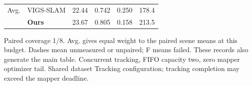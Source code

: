 \begin{table}[tbp]
{\begin{tabular}{@{}llcccc@{}}
\addlinespace[2pt]
\midrule
Avg. & VIGS-SLAM & 22.44 & 0.742 & 0.250 & 178.4 \\
 & \textbf{Ours} & 23.67 & 0.805 & 0.158 & 213.5 \\
\bottomrule
\end{tabular}}
\endgroup
\par\vspace{3pt}
\begin{minipage}{\linewidth}
\scriptsize\raggedright Paired coverage 1/8. Avg. gives equal weight to the paired scene means at this budget. Dashes mean unmeasured or unpaired; F means failed. These records also generate the main table. Concurrent tracking, FIFO capacity two, zero mapper optimizer tail. Shared dataset Tracking configuration; tracking completion may exceed the mapper deadline.
\end{minipage}
\end{table}

